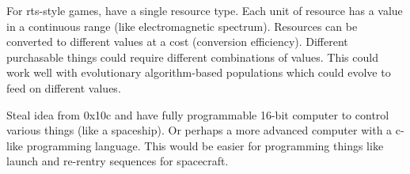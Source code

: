 
\begin{DoxyItemize}
\item For rts-\/style games, have a single resource type. Each unit of resource has a value in a continuous range (like electromagnetic spectrum). Resources can be converted to different values at a cost (conversion efficiency). Different purchasable things could require different combinations of values. This could work well with evolutionary algorithm-\/based populations which could evolve to feed on different values.
\item Steal idea from 0x10c and have fully programmable 16-\/bit computer to control various things (like a spaceship). Or perhaps a more advanced computer with a c-\/like programming language. This would be easier for programming things like launch and re-\/rentry sequences for spacecraft. 
\end{DoxyItemize}